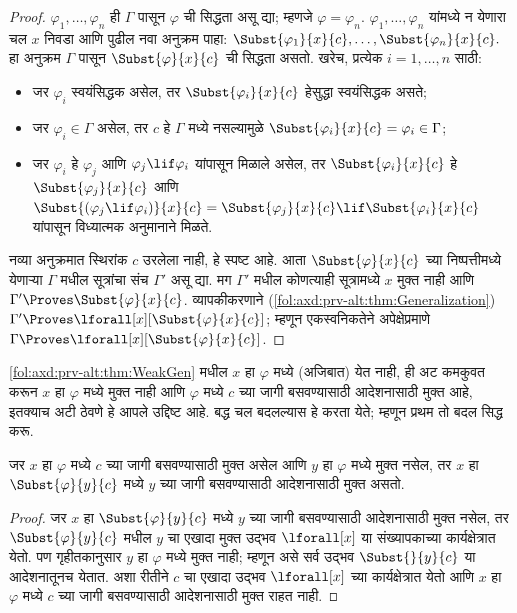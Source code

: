 \begin{proof} $\varphi_1,\ldots,\varphi_n$ ही $\Gamma$ पासून $\varphi$ ची सिद्धता
असू द्या; म्हणजे $\varphi=\varphi_n$. $\varphi_1,\ldots,\varphi_n$ यांमध्ये न येणारा चल $x$
निवडा आणि पुढील नवा अनुक्रम पाहा:
$\Subst{\varphi_1}{x}{c},\ldots,\Subst{\varphi_n}{x}{c}.$ हा अनुक्रम
$\Gamma$ पासून $\Subst{\varphi}{x}{c}$ ची सिद्धता असतो. खरेच, प्रत्येक
$i=1,\ldots,n$ साठी: \begin{itemize}
\item जर $\varphi_i$ स्वयंसिद्धक असेल, तर $\Subst{\varphi_i}{x}{c}$ हेसुद्धा स्वयंसिद्धक असते;
\item जर $\varphi_i \in \Gamma$ असेल, तर $c$ हे $\Gamma$ मध्ये नसल्यामुळे
$\Subst{\varphi_i}{x}{c} = \varphi_i \in \Gamma$;
\item जर $\varphi_i$ हे $\varphi_j$ आणि $\varphi_j \lif \varphi_i$ यांपासून मिळाले असेल,
तर $\Subst{\varphi_i}{x}{c}$ हे $\Subst{\varphi_j}{x}{c}$ आणि
$\Subst{(\varphi_j \lif \varphi_i)}{x}{c}
= \Subst{\varphi_j}{x}{c} \lif \Subst{\varphi_i}{x}{c}$ यांपासून विध्यात्मक
अनुमानाने मिळते. \end{itemize}
नव्या अनुक्रमात स्थिरांक $c$ उरलेला नाही, हे स्पष्ट आहे. आता
$\Subst{\varphi}{x}{c}$ च्या निष्पत्तीमध्ये येणाऱ्या $\Gamma$ मधील
सूत्रांचा संच $\Gamma'$ असू द्या. मग $\Gamma'$ मधील कोणत्याही
सूत्रामध्ये $x$ मुक्त नाही आणि $\Gamma' \Proves \Subst{\varphi}{x}{c}$.
व्यापकीकरणाने (\ref{fol:axd:prv-alt:thm:Generalization}) $\Gamma'
\Proves \lforall[x][\Subst{\varphi}{x}{c}]$; म्हणून एकस्वनिकतेने
अपेक्षेप्रमाणे $\Gamma \Proves
\lforall[x][\Subst{\varphi}{x}{c}]$. \end{proof}


\begin{explain}
\ref{fol:axd:prv-alt:thm:WeakGen} मधील $x$ हा $\varphi$ मध्ये (अजिबात) येत नाही, ही अट
कमकुवत करून $x$ हा $\varphi$ मध्ये मुक्त नाही आणि $\varphi$ मध्ये $c$ च्या जागी
बसवण्यासाठी आदेशनासाठी मुक्त आहे, इतक्याच अटी ठेवणे हे आपले उद्दिष्ट आहे.
बद्ध चल बदलल्यास हे करता येते; म्हणून प्रथम तो बदल सिद्ध करू.
\end{explain}

\begin{lem}
\label{fol:axd:prv-alt:lem:free-for}
जर $x$ हा $\varphi$ मध्ये $c$ च्या जागी बसवण्यासाठी मुक्त असेल आणि $y$
हा $\varphi$ मध्ये मुक्त नसेल, तर $x$ हा $\Subst{\varphi}{y}{c}$ मध्ये
$y$ च्या जागी बसवण्यासाठी आदेशनासाठी मुक्त असतो.
\end{lem}

\begin{proof} जर $x$ हा $\Subst{\varphi}{y}{c}$ मध्ये $y$ च्या जागी
बसवण्यासाठी आदेशनासाठी मुक्त नसेल, तर $\Subst{\varphi}{y}{c}$ मधील $y$ चा एखादा
मुक्त उद्भव $\lforall[x]$ या संख्यापकाच्या कार्यक्षेत्रात येतो. पण
गृहीतकानुसार $y$ हा $\varphi$ मध्ये मुक्त नाही; म्हणून असे सर्व उद्भव
$\Subst{}{y}{c}$ या आदेशनातूनच येतात. अशा रीतीने $c$ चा एखादा
उद्भव $\lforall[x]$ च्या कार्यक्षेत्रात येतो आणि $x$ हा $\varphi$ मध्ये
$c$ च्या जागी बसवण्यासाठी आदेशनासाठी मुक्त राहत नाही.
\end{proof}


